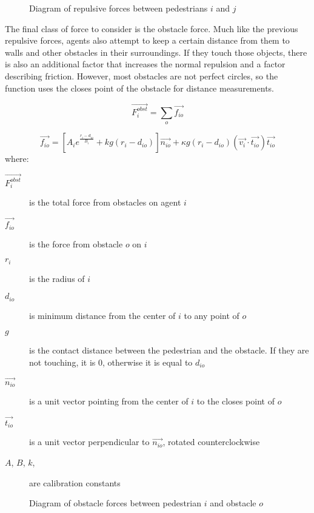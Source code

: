 \documentclass[twoside, 11pt]{article}
\begin{document}
\begin{figure}[h]
  \centering
  
  \caption{Diagram of repulsive forces between pedestrians $i$ and $j$}
  \label{fig:repulsive-forces}
\end{figure}

The final class of force to consider is the obstacle force. Much like the previous repulsive forces, agents also attempt to keep a certain distance from them to walls and other obstacles in their surroundings. If they touch those objects, there is also an additional factor that increases the normal repulsion and a factor describing friction. However, most obstacles are not perfect circles, so the function uses the closes point of the obstacle for distance measurements.

\begin{equation}
  \vec{F_i^{obst}} = \sum_o\vec{f_{io}}
  \label{eq:pedestrian_obstacle_total}
\end{equation}

\begin{equation}
  \vec{f_{io}} = [A_ie^{\frac{r_i - d_{io}}{B_i}} + kg(r_i-d_{io})]\vec{n_{io}} + \kappa g (r_i - d_{io})(\vec{v_i} \cdot \vec{t_{io}})\vec{t_{io}}
  \label{eq:pedestrian_obstacle}
\end{equation}
where:
\begin{description}
  \item[$\vec{F_i^{obst}}$] is the total force from obstacles on agent $i$
  \item[$\vec{f_{io}}$] is the force from obstacle $o$ on $i$
  \item[$r_i$] is the radius of $i$
  \item[$d_{io}$] is minimum distance from the center of $i$ to any point of $o$
  \item[$g$] is the contact distance between the pedestrian and the obstacle. If they are not touching, it is $0$, otherwise it is equal to $d_{io}$
  \item[$\vec{n_{io}}$] is a unit vector pointing from the center of $i$ to the closes point of $o$
  \item[$\vec{t_{io}}$] is a unit vector perpendicular to $\vec{n_{io}}$, rotated counterclockwise
  \item[$A$, $B$, $k$, \kappa] are calibration constants
\end{description}

\begin{figure}[h]
  \centering
  
  \caption{Diagram of obstacle forces between pedestrian $i$ and obstacle $o$}
  \label{fig:obstacle-forces}
\end{figure}
\end{document}
